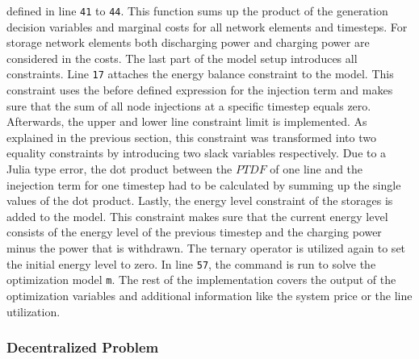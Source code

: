 defined in line \texttt{41} to \texttt{44}. This function sums up the product of the generation decision variables and marginal costs for all network elements and timesteps. For storage network elements both discharging power and charging power are considered in the costs. The last part of the model setup introduces all constraints. Line \texttt{17} attaches the energy balance constraint to the model. This constraint uses the before defined expression for the injection term and makes sure that the sum of all node injections at a specific timestep equals zero. Afterwards, the upper and lower line constraint limit is implemented. As explained in the previous section, this constraint was transformed into two equality constraints by introducing two slack variables respectively. Due to a Julia type error, the dot product between the $PTDF$ of one line and the inejection term for one timestep had to be calculated by summing up the single values of the dot product. Lastly, the energy level constraint of the storages is added to the model. This constraint makes sure that the current energy level consists of the energy level of the previous timestep and the charging power minus the power that is withdrawn. The ternary operator is utilized again to set the initial energy level to zero. In line \texttt{57}, the command is run to solve the optimization model \lstinline[language=julia]{m}. The rest of the implementation covers the output of the optimization variables and additional information like the system price or the line utilization.


\subsubsection{Decentralized Problem}
